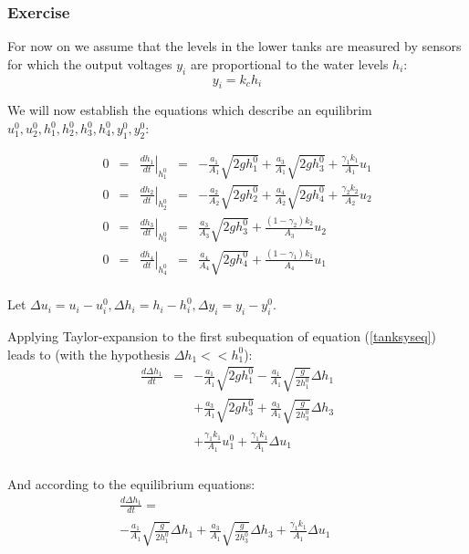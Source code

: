 \subsubsection{Exercise} 

For now on we assume that the levels in the lower tanks are measured by sensors for which the output voltages $y_i$ are proportional to the water levels $h_i$:
$$
y_i = k_c h_i
$$

We will now establish the equations which describe an equilibrim $u_1^0,u_2^0,h_1^0,h_2^0,h_3^0,h_4^0,y_1^0,y_2^0$:

$$
        \begin{array}{rcccl}
    0 & = & \left.\frac{dh_1}{dt}\right|_{h_1^0} & = &
            - \frac{a_1}{A_1}\sqrt{2gh_1^0} + \frac{a_3}{A_1}\sqrt{2gh_3^0} + \frac{\gamma_1k_1}{A_1}u_1\\ 

    0 & = & \left.\frac{dh_2}{dt}\right|_{h_2^0} & = &
            - \frac{a_2}{A_2}\sqrt{2gh_2^0} + \frac{a_4}{A_2}\sqrt{2gh_4^0} + \frac{\gamma_2k_2}{A_2}u_2\\ 

    0 & = & \left.\frac{dh_3}{dt}\right|_{h_3^0} & = &
            \frac{a_3}{A_3}\sqrt{2gh_3^0}+\frac{(1-\gamma_2)k_2}{A_3}u_2 \\ 

    0 & = & \left.\frac{dh_4}{dt}\right|_{h_4^0} & = &
            \frac{a_4}{A_4}\sqrt{2gh_4^0}+\frac{(1-\gamma_1)k_1}{A_4}u_1 \\ 
        \end{array}
$$

Let $\Delta u_i = u_i - u_i^0, \Delta h_i = h_i - h_i^0, \Delta y_i = y_i - y_i^0$.

Applying Taylor-expansion to the first subequation of equation (\ref{tanksyseq}) leads to (with the hypothesis $\Delta h_1 << h_1^0$):
$$
\begin{array}{rcl}
    \frac{d\Delta h_1}{dt} & = &  
    - \frac{a_1}{A_1}\sqrt{2gh_1^0} - \frac{a_1}{A_1}\sqrt{\frac{g}{2h_1^0}}\Delta h_1 \\ 
    & & 
    + \frac{a_3}{A_1}\sqrt{2gh_3^0} + \frac{a_3}{A_1}\sqrt{\frac{g}{2h_3^0}}\Delta h_3 \\ 
    & & 
    + \frac{\gamma_1k_1}{A_1}u_1^0 + \frac{\gamma_1k_1}{A_1}\Delta u_1 \phantom{\sqrt{\frac{h^0}{2}}} \\ 
\end{array}
$$

And according to the equilibrium equations:
\begin{multline*}
    \frac{d\Delta h_1}{dt} =  \\
    - \frac{a_1}{A_1}\sqrt{\frac{g}{2h_1^0}}\Delta h_1
    + \frac{a_3}{A_1}\sqrt{\frac{g}{2h_3^0}}\Delta h_3
    + \frac{\gamma_1k_1}{A_1}\Delta u_1 \phantom{\sqrt{\frac{h^0}{2}}}
\end{multline*}

